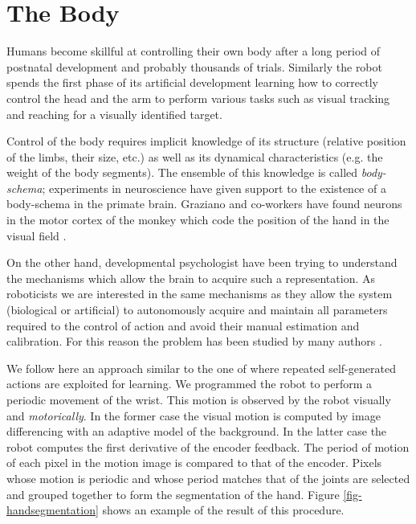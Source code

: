 \section{The Body}
\label{sect:body}

Humans become skillful at controlling their own body after a long period of postnatal development and probably thousands of trials. Similarly the robot spends the first phase of its artificial development learning how to correctly control the head and the arm to perform various tasks such as visual tracking and reaching for a visually identified target.

Control of the body requires implicit knowledge of its structure (relative position of the limbs, their size, etc.) as well as its dynamical characteristics (e.g. the weight of the body segments). The ensemble of this knowledge is called \emph{body-schema}; experiments in neuroscience have given support to the existence of a body-schema in the primate brain. Graziano and co-workers have found neurons in the motor cortex of the monkey which code the position of the hand in the visual field \cite{graziano99whereis,graziano00coding}.

On the other hand, developmental psychologist have been trying to understand the mechanisms which allow the brain to acquire such a representation. As roboticists we are interested in the same mechanisms as they allow the system (biological or artificial) to autonomously acquire and maintain all parameters required to the control of action and avoid their manual estimation and calibration. For this reason the problem has been studied by many authors \cite{yoshikawa03doestheinvariance,fitzpatrick04feelthebeat,metta03early}.

We follow here an approach similar to the one of \cite{fitzpatrick04feelthebeat,metta03early} where repeated self-generated actions are exploited for learning. We programmed the robot to perform a periodic movement of the wrist. This motion is observed by the robot visually and \emph{motorically}. In the former case the visual motion is computed by image differencing with an adaptive model of the background. In the latter case the robot computes the first derivative of the encoder feedback. The period of motion of each pixel in the motion image is compared to that of the encoder. Pixels whose motion is periodic and whose period matches that of the joints are selected and grouped together to form the segmentation of the hand. Figure \ref{fig-handsegmentation} shows an example of the result of this procedure.

